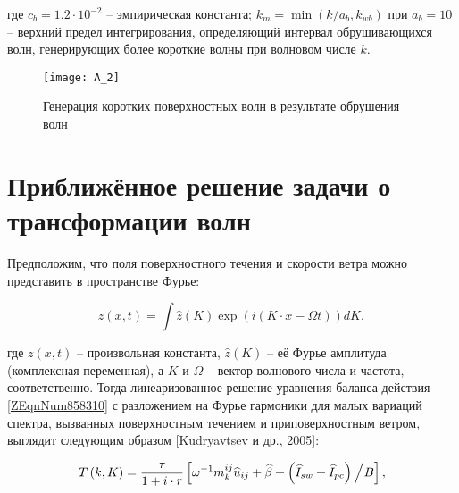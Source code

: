 \noindent где $c_{b} =1.2\cdot 10^{-2} $ -- эмпирическая константа; $k_{m} =\min (k/a_{b} ,k_{wb} )$ при $a_{b} =10$ -- верхний предел интегрирования, определяющий интервал обрушивающихся волн, генерирующих более короткие волны при волновом числе $k$. 



\begin{figure}[H]
    \texttt{[image: A\_2]}
    \caption{Генерация коротких поверхностных волн в результате обрушения волн}
    \label{fig:A.2}
\end{figure}


\section{Приближённое решение задачи о трансформации волн} \label{AppendixA1}

Предположим, что поля поверхностного течения и скорости ветра можно представить в пространстве Фурье:



\begin{equation} \label{1.36)} z\left(x,t\right)=\int \widehat{z}\left(K\right) \exp \left(i\left(K\cdot x-\Omega t\right)\right)dK,  \end{equation} 



\noindent где $z\left(x,t\right)$ -- произвольная константа, $\widehat{z}\left(K\right)$ -- её Фурье амплитуда (комплексная переменная), а $K$ и $\Omega $ -- вектор волнового числа и частота, соответственно. Тогда линеаризованное решение уравнения баланса действия \eqref{ZEqnNum858310} с разложением на Фурье гармоники для малых вариаций спектра, вызванных поверхностным течением и приповерхностным ветром, выглядит следующим образом [Kudryavtsev и др., 2005]:



\begin{equation} \label{1.37)} T\left(k,K\right)=\frac{\tau }{1+i\cdot r} \left[\omega ^{-1} m_{k}^{ij} \widehat{u}_{ij} +\widehat{\beta }+{\left(\widehat{I}_{sw} +\widehat{I}_{pc} \right)\mathord{\left/ {\vphantom {\left(\widehat{I}_{sw} +\widehat{I}_{pc} \right) B}} \right. \kern-\nulldelimiterspace} B} \right],  \end{equation} 



